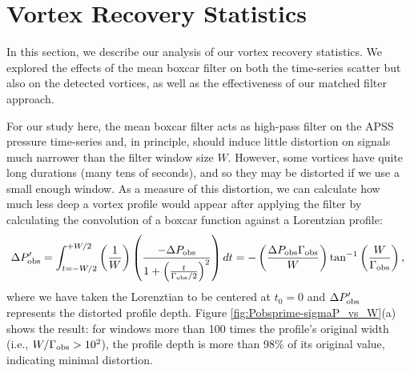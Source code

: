 \documentclass{aastex63}
\begin{document}
\vspace{5mm}
\facilities{}


\software{}



\appendix

\section{Vortex Recovery Statistics}
\label{sec:Vortex Recovery Statistics}
In this section, we describe our analysis of our vortex recovery statistics. We explored the effects of the mean boxcar filter on both the time-series scatter but also on the detected vortices, as well as the effectiveness of our matched filter approach.

For our study here, the mean boxcar filter  acts as high-pass filter on the APSS pressure time-series and, in principle, should induce little distortion on signals much narrower than the filter window size $W$. However, some vortices have quite long durations (many tens of seconds), and so they may be distorted if we use a small enough window. As a measure of this distortion, we can calculate how much less deep a vortex profile would appear after applying the filter by calculating the convolution of a boxcar function against a Lorentzian profile:
\begin{equation}
    \Delta P_{\rm obs}^\prime = \int_{t = -W/2}^{+W/2} \left( \frac{1}{W} \right) \left( \frac{-\Delta P_{\rm obs}}{1 + \left( \frac{t}{\Gamma_{\rm obs}/2} \right)^2} \right) dt = -\left( \frac{\Delta P_{\rm obs} \Gamma_{\rm obs}}{W}\right) \tan^{-1} \left( \frac{W}{\Gamma_{\rm obs}} \right), \label{eqn:tophat_convolution}
\end{equation}
where we have taken the Lorenztian to be centered at $t_0 = 0$ and $\Delta P_{\rm obs}^\prime$ represents the distorted profile depth. Figure \ref{fig:Pobsprime-sigmaP_vs_W}(a) shows the result: for windows more than 100 times the profile's original width (i.e., $W/\Gamma_{\rm obs} > 10^2$), the profile depth is more than 98\% of its original value, indicating minimal distortion. 
\end{document}
